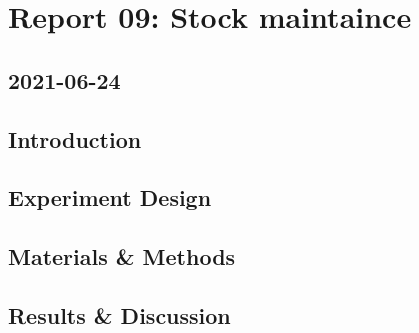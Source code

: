 \newpage
\section{Report 09: Stock maintaince}

\subsection*{2021-06-24}

\subsection{Introduction}


\subsection{Experiment Design}


\subsection{Materials \& Methods}


\subsection{Results \& Discussion}
